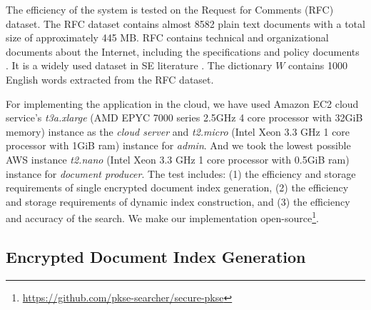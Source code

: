 \documentclass[sigconf,pdftex]{acmart}
\begin{document}
The efficiency of the system is tested on the Request for Comments (RFC) dataset. The RFC dataset contains almost 8582 plain text documents with a total size of approximately 445 MB. RFC contains technical and organizational documents about the Internet, including the specifications and policy documents \cite{rfc}. It is a widely used dataset in SE literature \cite{wang2010secure, wang2011enabling, smithamol2018pecs, xia2015secure, peng2018efficient}. The dictionary $W$ contains 1000 English words extracted from the RFC dataset. 


For implementing the application in the cloud, we have used Amazon EC2 cloud service's \textit{t3a.xlarge} (AMD EPYC 7000 series 2.5GHz 4 core processor with 32GiB memory) instance as the \textit{cloud server} and \textit{t2.micro} (Intel Xeon 3.3 GHz 1 core processor with 1GiB ram) instance for \textit{admin}. And we took the lowest possible AWS instance \textit{t2.nano} (Intel Xeon 3.3 GHz 1 core processor with 0.5GiB ram) instance for \textit{document producer}. The test includes: (1) the efficiency and storage requirements of single encrypted document index generation, (2) the efficiency and storage requirements of dynamic index construction, and (3) the efficiency and accuracy of the search. We make our implementation open-source\footnote{\url{https://github.com/pkse-searcher/secure-pkse}}.





\subsection{Encrypted Document Index Generation}
\end{document}

